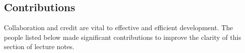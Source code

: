 \subsection*{Contributions}
Collaboration and credit are vital to effective and efficient development.  The people listed below made significant contributions to improve the clarity of this section of lecture notes. 